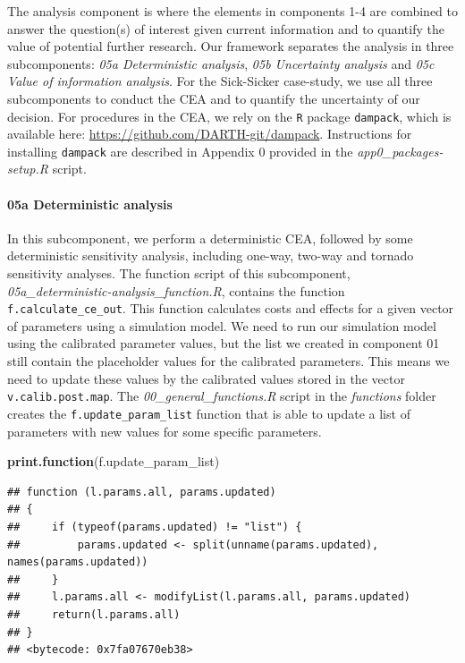 \documentclass[]{article}
\newenvironment{Shaded}{\begin{snugshade}}{\end{snugshade}}
\newcommand{\KeywordTok}[1]{\textcolor[rgb]{0.13,0.29,0.53}{\textbf{#1}}}
\newcommand{\NormalTok}[1]{#1}
\let\oldparagraph\paragraph
\renewcommand{\paragraph}[1]{\oldparagraph{#1}\mbox{}}
\begin{document}
The analysis component is where the elements in components 1-4 are
combined to answer the question(s) of interest given current information
and to quantify the value of potential further research. Our framework
separates the analysis in three subcomponents: \emph{05a Deterministic
analysis}, \emph{05b Uncertainty analysis} and \emph{05c Value of
information analysis}. For the Sick-Sicker case-study, we use all three
subcomponents to conduct the CEA and to quantify the uncertainty of our
decision. For procedures in the CEA, we rely on the \texttt{R} package
\texttt{dampack}, which is available here:
\url{https://github.com/DARTH-git/dampack}. Instructions for installing
\texttt{dampack} are described in Appendix 0 provided in the
\emph{app0\_packages-setup.R} script.

\paragraph{05a Deterministic analysis}\label{a-deterministic-analysis}

In this subcomponent, we perform a deterministic CEA, followed by some
deterministic sensitivity analysis, including one-way, two-way and
tornado sensitivity analyses. The function script of this subcomponent,
\emph{05a\_deterministic-analysis\_function.R}, contains the function
\texttt{f.calculate\_ce\_out}. This function calculates costs and
effects for a given vector of parameters using a simulation model. We
need to run our simulation model using the calibrated parameter values,
but the list we created in component 01 still contain the placeholder
values for the calibrated parameters. This means we need to update these
values by the calibrated values stored in the vector
\texttt{v.calib.post.map}. The \emph{00\_general\_functions.R} script in
the \emph{functions} folder creates the \texttt{f.update\_param\_list}
function that is able to update a list of parameters with new values for
some specific parameters.

\begin{Shaded}
\begin{Highlighting}[]
\KeywordTok{print.function}\NormalTok{(f.update_param_list)}
\end{Highlighting}
\end{Shaded}

\begin{verbatim}
## function (l.params.all, params.updated) 
## {
##     if (typeof(params.updated) != "list") {
##         params.updated <- split(unname(params.updated), names(params.updated))
##     }
##     l.params.all <- modifyList(l.params.all, params.updated)
##     return(l.params.all)
## }
## <bytecode: 0x7fa07670eb38>
\end{verbatim}
\end{document}
